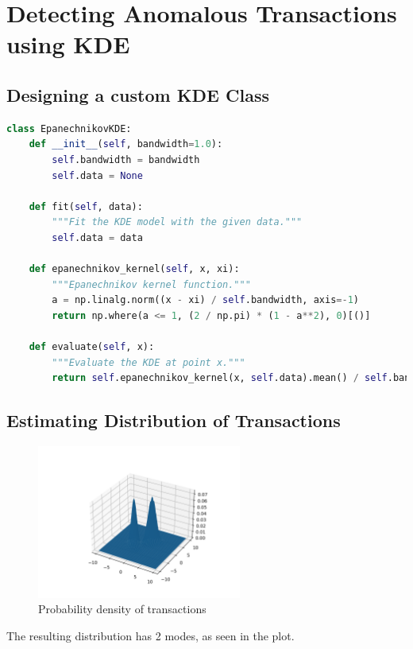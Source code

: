 \section{Detecting Anomalous Transactions using KDE}
\subsection{Designing a custom KDE Class}
\begin{lstlisting}[language=Python, caption={Python code to implement \texttt{EpanechnikovKDE} class}, label=lst:epanechnikovkde]
class EpanechnikovKDE:
    def __init__(self, bandwidth=1.0):
        self.bandwidth = bandwidth
        self.data = None

    def fit(self, data):
        """Fit the KDE model with the given data."""
        self.data = data

    def epanechnikov_kernel(self, x, xi):
        """Epanechnikov kernel function."""
        a = np.linalg.norm((x - xi) / self.bandwidth, axis=-1)
        return np.where(a <= 1, (2 / np.pi) * (1 - a**2), 0)[()]

    def evaluate(self, x):
        """Evaluate the KDE at point x."""
        return self.epanechnikov_kernel(x, self.data).mean() / self.bandwidth**2
\end{lstlisting}

\subsection{Estimating Distribution of Transactions}
\vspace{-20pt}
\begin{figure}[H]
	\centering
	\includegraphics[width=0.6\textwidth]{images/2/transaction_distribution.png}
	\caption{Probability density of transactions}
\end{figure}
The resulting distribution has 2 modes, as seen in the plot.
